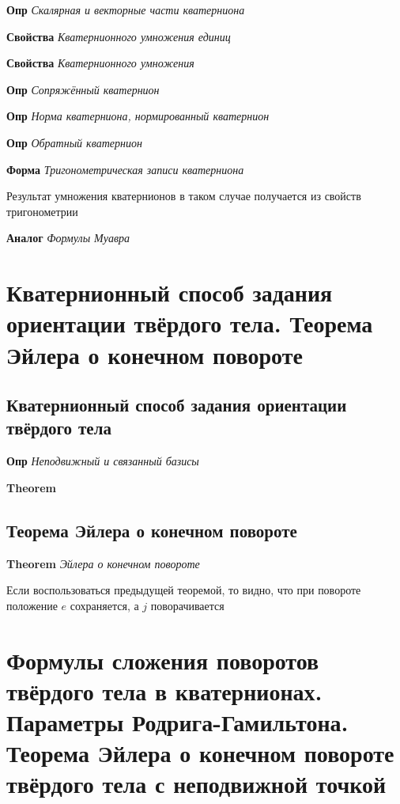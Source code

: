 \documentclass[a4paper, 14pt]{article}
\begin{document}
    \textbf{Опр} \textit{Скалярная и векторные части кватерниона}
    
    \textbf{Свойства} \textit{Кватернионного умножения единиц}
    
    \textbf{Свойства} \textit{Кватернионного умножения}
    
    \textbf{Опр} \textit{Сопряжённый кватернион}
    
    \textbf{Опр} \textit{Норма кватерниона, нормированный кватернион}
    
    \textbf{Опр} \textit{Обратный кватернион}
    
    \textbf{Форма} \textit{Тригонометрическая записи кватерниона}
    
    Результат умножения кватернионов в таком случае получается из свойств тригонометрии
    
    \textbf{Аналог} \textit{Формулы Муавра}
    
    \section{Кватернионный способ задания ориентации твёрдого тела.
    Теорема Эйлера о конечном повороте}
    
    \subsection{Кватернионный способ задания ориентации твёрдого тела}
    
    \textbf{Опр} \textit{Неподвижный и связанный базисы}
    
    \textbf{Theorem}
    
    \subsection{Теорема Эйлера о конечном повороте}
    
    \textbf{Theorem} \textit{Эйлера о конечном повороте}
    
    Если воспользоваться предыдущей теоремой, то видно, что при повороте положение $e$ сохраняется, а $j$ поворачивается
    
    \section{Формулы сложения поворотов твёрдого тела в кватернионах.
    Параметры Родрига-Гамильтона.
    Теорема Эйлера о конечном повороте твёрдого тела с неподвижной точкой}
    
\end{document}
